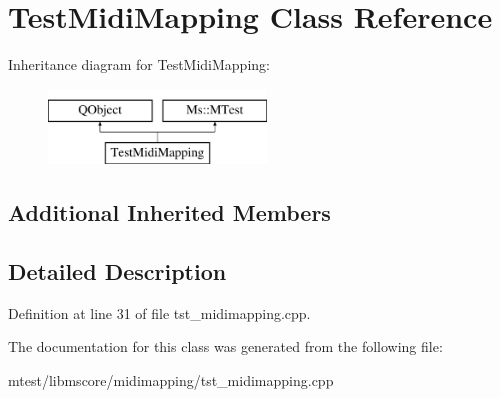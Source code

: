 \hypertarget{class_test_midi_mapping}{}\section{Test\+Midi\+Mapping Class Reference}
\label{class_test_midi_mapping}
Inheritance diagram for Test\+Midi\+Mapping\+:\begin{figure}[H]
\begin{center}
\leavevmode
\includegraphics[height=2.000000cm]{class_test_midi_mapping}
\end{center}
\end{figure}
\subsection*{Additional Inherited Members}


\subsection{Detailed Description}


Definition at line 31 of file tst\+\_\+midimapping.\+cpp.



The documentation for this class was generated from the following file\+:\begin{DoxyCompactItemize}
\item 
mtest/libmscore/midimapping/tst\+\_\+midimapping.\+cpp\end{DoxyCompactItemize}
